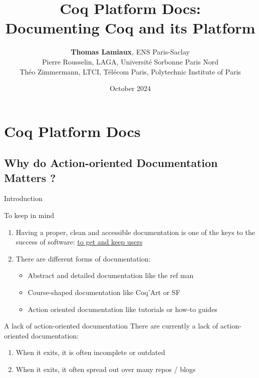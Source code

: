 \documentclass[10pt]{beamer}
\title{Coq Platform Docs: \\ Documenting Coq and its Platform}
\author{\textbf{Thomas Lamiaux}, ENS Paris-Saclay \\
Pierre Rousselin, LAGA, Université Sorbonne Paris Nord \\
Théo Zimmermann, LTCI, Télécom Paris, Polytechnic Institute of Paris }
\date{October 2024}
\begin{document}
\begin{frame}
    \maketitle
\end{frame}


\section*{Coq Platform Docs}

\subsection{Why do Action-oriented Documentation Matters ?}

\begin{frame}{Introduction}
  \begin{tcbProp}{To keep in mind}
    \begin{enumerate}
      \item Having a proper, clean and accessible documentation is one of the
            keys to the success of software: \ul{to get and keep users}
      \item<2-> There are different forms of documentation:
      \begin{itemize}[label=$-$]
        \item Abstract and detailed documentation like the ref man
        \item Course-shaped documentation like Coq'Art or SF
        \item Action oriented documentation like tutorials or how-to guides
      \end{itemize}
    \end{enumerate}
  \end{tcbProp}
  \begin{tcbPbl}{A lack of action-oriented documentation }
    There are currently a lack of action-oriented documentation:
    \begin{enumerate}
      \item When it exits, it is often incomplete or outdated
      \item When it exits, it often spread out over many repos / blogs
    \end{enumerate}
  \end{tcbPbl}
\end{frame}
\end{document}

